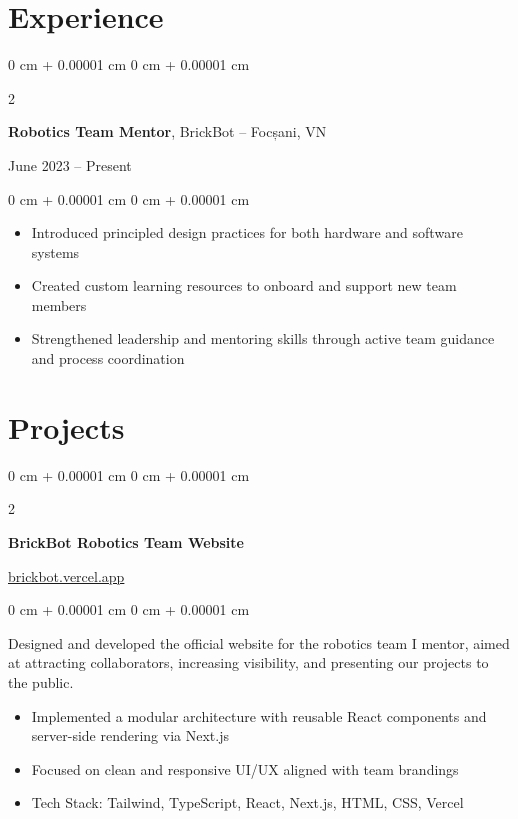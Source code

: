 \documentclass[10pt, letterpaper]{article}
\newenvironment{highlights}{
    \begin{itemize}[
        topsep=0.10 cm,
        parsep=0.10 cm,
        partopsep=0pt,
        itemsep=0pt,
        leftmargin=0 cm + 10pt
    ]
}{
    \end{itemize}
} %
\newenvironment{onecolentry}{
    \begin{adjustwidth}{
        0 cm + 0.00001 cm
    }{
        0 cm + 0.00001 cm
    }
}{
    \end{adjustwidth}
} %
\newenvironment{twocolentry}[2][]{
    \onecolentry
    \def\secondColumn{#2}
    \setcolumnwidth{\fill, 4.5 cm}
    \begin{paracol}{2}
}{
    \switchcolumn \raggedleft \secondColumn
    \end{paracol}
    \endonecolentry
} %
\begin{document}
    \section{Experience}
        
        \begin{twocolentry}{
    June 2023 – Present
}
    \textbf{Robotics Team Mentor}, BrickBot -- Focșani, VN
\end{twocolentry}

\vspace{0.10 cm}
\begin{onecolentry}
    \begin{highlights}
        \item Introduced principled design practices for both hardware and software systems
        \item Created custom learning resources to onboard and support new team members
        \item Strengthened leadership and mentoring skills through active team guidance and process coordination
    \end{highlights}
\end{onecolentry}


    
    \section{Projects}

        \begin{twocolentry}{
    \href{https://brickbot.vercel.app/en/home}{brickbot.vercel.app}
}
    \textbf{BrickBot Robotics Team Website}
\end{twocolentry}

\vspace{0.10 cm}
\begin{onecolentry}
    Designed and developed the official website for the robotics team I mentor, aimed at attracting collaborators, increasing visibility, and presenting our projects to the public.

    \begin{highlights}
        \item Implemented a modular architecture with reusable React components and server-side rendering via Next.js
        \item Focused on clean and responsive UI/UX aligned with team brandings
        \item Tech Stack: Tailwind, TypeScript, React, Next.js, HTML, CSS, Vercel
    \end{highlights}
\end{onecolentry}
\end{document}
